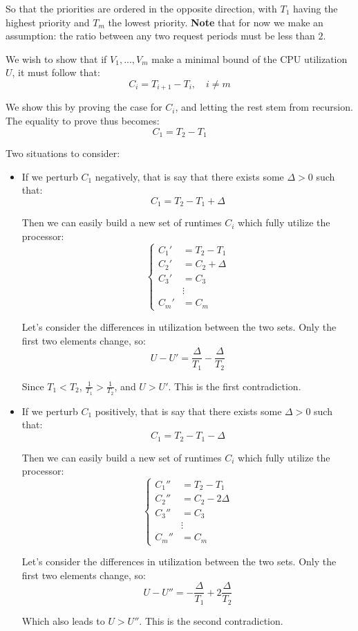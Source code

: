 \documentclass[a4paper,11pt]{article}
\begin{document}
So that the priorities are ordered in the opposite direction, with $T_1$ having the highest priority and $T_m$ the lowest priority.
\textbf{Note} that for now we make an assumption: the ratio between any two request periods must be less than $2$.

We wish to show that if $V_1, ..., V_m$ make a minimal bound of the CPU utilization $U$, it must follow that:
$$
	C_i = T_{i + 1} - T_i, \quad i \neq m
$$

We show this by proving the case for $C_i$, and letting the rest stem from recursion.
The equality to prove thus becomes:
$$
	C_1 = T_2 - T_1
$$

Two situations to consider:
\begin{itemize}
	\item If we perturb $C_1$ negatively, that is say that there exists some $\Delta > 0$ such that:
	      $$
		      C_1 = T_2 - T_1 + \Delta
	      $$

	      Then we can easily build a new set of runtimes $C_i$ which fully utilize the processor:
	      $$
		      \begin{cases}
			      C_1' & = T_2 - T_1    \\
			      C_2' & = C_2 + \Delta \\
			      C_3' & = C_3          \\
			           & \vdots         \\
			      C_m' & = C_m
		      \end{cases}
	      $$

	      Let's consider the differences in utilization between the two sets.
	      Only the first two elements change, so:
	      $$
		      U - U' = \frac{\Delta}{T_1} - \frac{\Delta}{T_2}
	      $$

	      Since $T_1 < T_2$, $\frac{1}{T_1} > \frac{1}{T_2}$, and $U > U'$.
	      This is the first contradiction.

	\item If we perturb $C_1$ positively, that is say that there exists some $\Delta > 0$ such that:
	      $$
		      C_1 = T_2 - T_1 - \Delta
	      $$

	      Then we can easily build a new set of runtimes $C_i$ which fully utilize the processor:
	      $$
		      \begin{cases}
			      C_1'' & = T_2 - T_1      \\
			      C_2'' & = C_2 - 2 \Delta \\
			      C_3'' & = C_3            \\
			            & \vdots           \\
			      C_m'' & = C_m
		      \end{cases}
	      $$

	      Let's consider the differences in utilization between the two sets.
	      Only the first two elements change, so:
	      $$
		      U - U'' = -\frac{\Delta}{T_1} + 2 \frac{\Delta}{T_2}
	      $$

	      Which also leads to $U > U''$.
	      This is the second contradiction.
\end{itemize}
\end{document}
